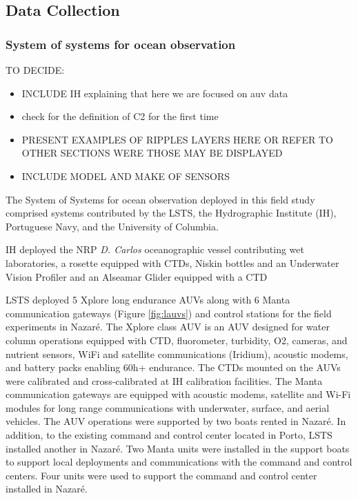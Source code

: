 \subsection{Data Collection}

\subsubsection{System of systems for ocean observation}

TO DECIDE:
\begin{itemize}
    \item INCLUDE IH explaining that here we are focused on auv data
    \item check for the definition of C2 for the first time
    \item PRESENT EXAMPLES OF RIPPLES LAYERS HERE OR REFER TO OTHER SECTIONS WERE THOSE MAY BE DISPLAYED
    \item INCLUDE MODEL AND MAKE OF SENSORS
\end{itemize}

The System of Systems for ocean observation deployed in this field study
comprised systems contributed by the LSTS, the Hydrographic Institute
(IH), Portuguese Navy, and the University of Columbia.

IH deployed the NRP \emph{D. Carlos} oceanographic vessel contributing
wet laboratories, a rosette equipped with CTDs, Niskin bottles and an
Underwater Vision
Profiler %
and an Alseamar Glider equipped with a
CTD %

LSTS deployed 5 Xplore long endurance AUVs along with 6 Manta
communication gateways (Figure \ref{fig:lauvs}) and control stations for
the field experiments in Nazaré. The Xplore class AUV \cite{lauvurl} is
an AUV designed for water column operations equipped with CTD,
fluorometer, turbidity, O2, cameras, and nutrient sensors, WiFi and
satellite communications (Iridium), acoustic modems, and battery packs
enabling 60h+ endurance. The CTDs mounted on the AUVs were calibrated
and cross-calibrated at IH calibration facilities. The Manta
communication gateways \cite{} are equipped with acoustic modems,
satellite and Wi-Fi modules for long range communications with
underwater, surface, and aerial vehicles. The AUV operations were
supported by two boats rented in Nazaré. In addition, to the existing
command and control center located in Porto, LSTS installed another in
Nazaré. Two Manta units were installed in the support boats to support
local deployments and communications with the command and control
centers. Four units were used to support the command and control center
installed in Nazaré.

